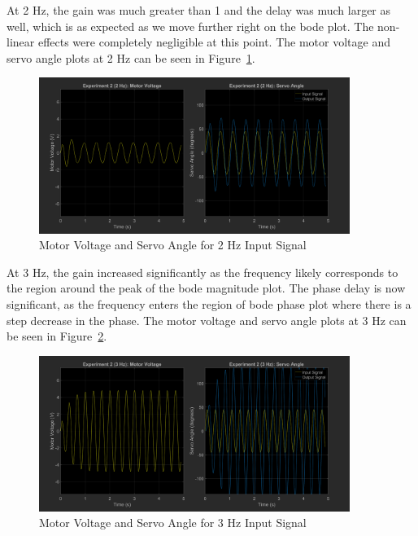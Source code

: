 \documentclass[12pt]{article}
\begin{document}
At 2 Hz, the gain was much greater than 1 and the delay was much larger as well, which is as expected as we move further right on the bode plot. The non-linear effects were completely negligible at this point. The motor voltage and servo angle plots at 2 Hz can be seen in Figure~\ref{fig:exp2_2}.
\begin{figure}[h!]
    \centering
    \includegraphics[width=0.9\textwidth]{exp2_2}
    \caption{\label{fig:exp2_2}Motor Voltage and Servo Angle for 2 Hz Input Signal}
\end{figure}

At 3 Hz, the gain increased significantly as the frequency likely corresponds to the region around the peak of the bode magnitude plot. The phase delay is now significant, as the frequency enters the region of bode phase plot where there is a step decrease in the phase. The motor voltage and servo angle plots at 3 Hz can be seen in Figure~\ref{fig:exp2_3}.
\begin{figure}[h!]
    \centering
    \includegraphics[width=0.9\textwidth]{exp2_3}
    \caption{\label{fig:exp2_3}Motor Voltage and Servo Angle for 3 Hz Input Signal}
\end{figure}
\end{document}
